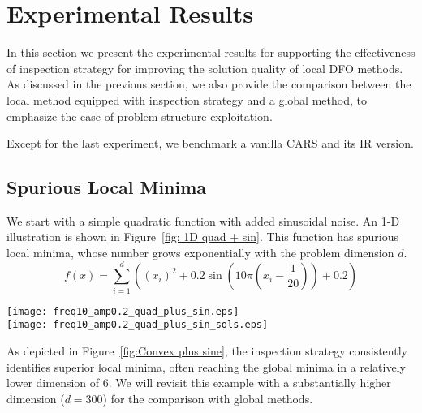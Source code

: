 \section{Experimental Results}
In this section we present the experimental results for supporting the effectiveness of inspection strategy for improving the solution quality of local DFO methods. As discussed in the previous section, we also provide the comparison between the local method equipped with inspection strategy and a global method, to emphasize the ease of problem structure exploitation.

Except for the last experiment, we benchmark a vanilla CARS and its IR version.

\subsection*{Spurious Local Minima}
We start with a simple quadratic function with added sinusoidal noise. An 1-D illustration is shown in Figure~\ref{fig: 1D quad + sin}.
This function has spurious local minima, whose number grows exponentially with the problem dimension $d$.
\begin{equation*}
    f(x) =  \sum_{i=1}^{d} \left((x_i)^2 + 0.2 \sin\left(10\pi(x_i - \frac{1}{20})\right) + 0.2 \right)
\end{equation*}
\begin{figure*}
    \centering
    {\texttt{[image: freq10\_amp0.2\_quad\_plus\_sin.eps]}}\\
    \vspace{3mm}
    {\texttt{[image: freq10\_amp0.2\_quad\_plus\_sin\_sols.eps]}}
    \caption{Comparison of CARS and the Inspect-as-Running version of CARS for the quadratic function with sinusoidal noise.}
    \label{fig:Convex plus sine}
\end{figure*}
As depicted in Figure~\ref{fig:Convex plus sine}, the inspection strategy consistently identifies superior local minima, often reaching the global minima in a relatively lower dimension of 6.
We will revisit this example with a substantially higher dimension ($d=300$) for the comparison with global methods.

